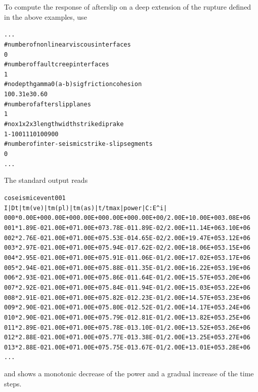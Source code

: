 \documentclass[10pt]{article}
\begin{document}
To compute the response of afterslip on a deep extension of the rupture defined in the above examples, use
\begin{alltt}
...
# number of nonlinear viscous interfaces
0
# number of fault creep interfaces
{\color{orange}1}
# no depth   gamma0 (a-b)sig friction cohesion
{\color{orange}   1     0      0.3      1e3      0.6        0}
# number of afterslip planes
{\color{orange}1}
# no  x1 x2 x3 length width strike  dip rake
{\color{orange}   1 -10  0 11     10    10      0   90    0}
# number of inter-seismic strike-slip segments
0
...
\end{alltt}
The standard output reads
\begin{alltt}
coseismic event 001
 I  |   Dt   | tm(ve) | tm(pl) | tm(as) |     t/tmax     | power  |  C:E^i |
000* 0.00E+00 0.00E+00 0.00E+00 0.00E+00 0.00E+00/2.00E+1 0.00E+00 3.08E+06
001* {\color{NavyBlue}1.89E-02} 1.00E+07 1.00E+07 {\color{NavyBlue}3.78E-01} 1.89E-02/2.00E+1 {\color{NavyBlue}1.14E+06 3.10E+06}
002* {\color{NavyBlue}2.76E-02} 1.00E+07 1.00E+07 {\color{NavyBlue}5.53E-01} 4.65E-02/2.00E+1 {\color{NavyBlue}9.47E+05 3.12E+06}
003* {\color{NavyBlue}2.97E-02} 1.00E+07 1.00E+07 {\color{NavyBlue}5.94E-01} 7.62E-02/2.00E+1 {\color{NavyBlue}8.06E+05 3.15E+06}
004* {\color{NavyBlue}2.95E-02} 1.00E+07 1.00E+07 {\color{NavyBlue}5.91E-01} 1.06E-01/2.00E+1 {\color{NavyBlue}7.02E+05 3.17E+06}
005* {\color{NavyBlue}2.94E-02} 1.00E+07 1.00E+07 {\color{NavyBlue}5.88E-01} 1.35E-01/2.00E+1 {\color{NavyBlue}6.22E+05 3.19E+06}
006* {\color{NavyBlue}2.93E-02} 1.00E+07 1.00E+07 {\color{NavyBlue}5.86E-01} 1.64E-01/2.00E+1 {\color{NavyBlue}5.57E+05 3.20E+06}
007* {\color{NavyBlue}2.92E-02} 1.00E+07 1.00E+07 {\color{NavyBlue}5.84E-01} 1.94E-01/2.00E+1 {\color{NavyBlue}5.03E+05 3.22E+06}
008* {\color{NavyBlue}2.91E-02} 1.00E+07 1.00E+07 {\color{NavyBlue}5.82E-01} 2.23E-01/2.00E+1 {\color{NavyBlue}4.57E+05 3.23E+06}
009* {\color{NavyBlue}2.90E-02} 1.00E+07 1.00E+07 {\color{NavyBlue}5.80E-01} 2.52E-01/2.00E+1 {\color{NavyBlue}4.17E+05 3.24E+06}
010* {\color{NavyBlue}2.90E-02} 1.00E+07 1.00E+07 {\color{NavyBlue}5.79E-01} 2.81E-01/2.00E+1 {\color{NavyBlue}3.82E+05 3.25E+06}
011* {\color{NavyBlue}2.89E-02} 1.00E+07 1.00E+07 {\color{NavyBlue}5.78E-01} 3.10E-01/2.00E+1 {\color{NavyBlue}3.52E+05 3.26E+06}
012* {\color{NavyBlue}2.88E-02} 1.00E+07 1.00E+07 {\color{NavyBlue}5.77E-01} 3.38E-01/2.00E+1 {\color{NavyBlue}3.25E+05 3.27E+06}
013* {\color{NavyBlue}2.88E-02} 1.00E+07 1.00E+07 {\color{NavyBlue}5.75E-01} 3.67E-01/2.00E+1 {\color{NavyBlue}3.01E+05 3.28E+06}
...
\end{alltt}
and shows a monotonic decrease of the power and a gradual increase of the time steps.
\end{document}
